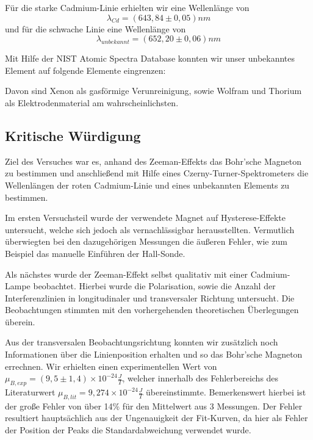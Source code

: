 Für die starke Cadmium-Linie erhielten wir eine Wellenlänge von
\[
\lambda_{Cd} = (643,84 \pm 0,05) nm \tag{b}\label{res:b}
\]
und für die schwache Linie eine Wellenlänge von
\[
\lambda_{unbekannt} = (652,20 \pm 0,06) nm \tag{c}
\]

Mit Hilfe der NIST Atomic Spectra Database\cite{NIST} konnten wir unser unbekanntes Element auf folgende Elemente eingrenzen:

\begin{inlineitemize}
   
  
\end{inlineitemize}
Davon sind Xenon als gasförmige Verunreinigung, sowie Wolfram und Thorium als Elektrodenmaterial am wahrscheinlichsten.


\subsection{Kritische Würdigung}

Ziel des Versuches war es, anhand des Zeeman-Effekts das Bohr'sche Magneton zu bestimmen und anschließend mit Hilfe eines Czerny-Turner-Spektrometers die Wellenlängen der roten Cadmium-Linie und eines unbekannten Elements zu bestimmen.

Im ersten Versuchsteil wurde der verwendete Magnet auf Hysterese-Effekte untersucht, welche sich jedoch als vernachlässigbar herausstellten. Vermutlich überwiegten bei den dazugehörigen Messungen die äußeren Fehler, wie zum Beispiel das manuelle Einführen der Hall-Sonde.

Als nächstes wurde der Zeeman-Effekt selbst qualitativ mit einer Cadmium-Lampe beobachtet. Hierbei wurde die Polarisation, sowie die Anzahl der Interferenzlinien in longitudinaler und transversaler Richtung untersucht. Die Beobachtungen stimmten mit den vorhergehenden theoretischen Überlegungen überein.

Aus der transversalen Beobachtungsrichtung konnten wir zusätzlich noch Informationen über die Linienposition erhalten und so das Bohr'sche Magneton errechnen. Wir erhielten einen experimentellen Wert von $\mu_{B, exp} = (9,5 \pm 1,4) \times 10^{-24} \frac{J}{T}$, welcher innerhalb des Fehlerbereichs des Literaturwert $\mu_{B, lit} = 9,274 \times 10^{-24} \frac{J}{T}$ übereinstimmte. Bemerkenswert hierbei ist der große Fehler von über 14\% für den Mittelwert aus 3 Messungen. Der Fehler resultiert hauptsächlich aus der Ungenauigkeit der Fit-Kurven, da hier als Fehler der Position der Peaks die Standardabweichung verwendet wurde.

